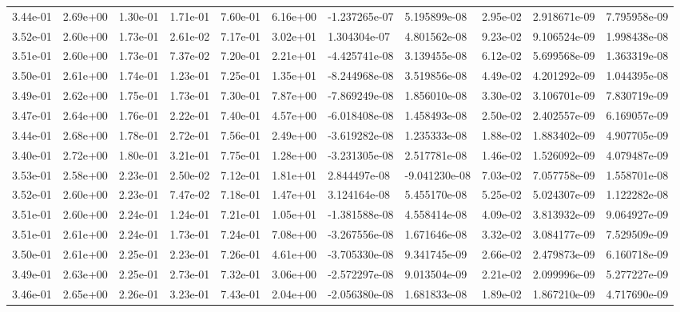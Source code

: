 \begin{longtable}{| p{} | p{} |}
3.44e-01 & 2.69e+00 & 1.30e-01 & 1.71e-01 & 7.60e-01 & 6.16e+00 & -1.237265e-07 &  5.195899e-08 &  2.95e-02 &  2.918671e-09 &  7.795958e-09 \\
3.52e-01 & 2.60e+00 & 1.73e-01 & 2.61e-02 & 7.17e-01 & 3.02e+01 &  1.304304e-07 &  4.801562e-08 &  9.23e-02 &  9.106524e-09 &  1.998438e-08 \\
3.51e-01 & 2.60e+00 & 1.73e-01 & 7.37e-02 & 7.20e-01 & 2.21e+01 & -4.425741e-08 &  3.139455e-08 &  6.12e-02 &  5.699568e-09 &  1.363319e-08 \\
3.50e-01 & 2.61e+00 & 1.74e-01 & 1.23e-01 & 7.25e-01 & 1.35e+01 & -8.244968e-08 &  3.519856e-08 &  4.49e-02 &  4.201292e-09 &  1.044395e-08 \\
3.49e-01 & 2.62e+00 & 1.75e-01 & 1.73e-01 & 7.30e-01 & 7.87e+00 & -7.869249e-08 &  1.856010e-08 &  3.30e-02 &  3.106701e-09 &  7.830719e-09 \\
3.47e-01 & 2.64e+00 & 1.76e-01 & 2.22e-01 & 7.40e-01 & 4.57e+00 & -6.018408e-08 &  1.458493e-08 &  2.50e-02 &  2.402557e-09 &  6.169057e-09 \\
3.44e-01 & 2.68e+00 & 1.78e-01 & 2.72e-01 & 7.56e-01 & 2.49e+00 & -3.619282e-08 &  1.235333e-08 &  1.88e-02 &  1.883402e-09 &  4.907705e-09 \\
3.40e-01 & 2.72e+00 & 1.80e-01 & 3.21e-01 & 7.75e-01 & 1.28e+00 & -3.231305e-08 &  2.517781e-08 &  1.46e-02 &  1.526092e-09 &  4.079487e-09 \\
3.53e-01 & 2.58e+00 & 2.23e-01 & 2.50e-02 & 7.12e-01 & 1.81e+01 &  2.844497e-08 & -9.041230e-08 &  7.03e-02 &  7.057758e-09 &  1.558701e-08 \\
3.52e-01 & 2.60e+00 & 2.23e-01 & 7.47e-02 & 7.18e-01 & 1.47e+01 &  3.124164e-08 &  5.455170e-08 &  5.25e-02 &  5.024307e-09 &  1.122282e-08 \\
3.51e-01 & 2.60e+00 & 2.24e-01 & 1.24e-01 & 7.21e-01 & 1.05e+01 & -1.381588e-08 &  4.558414e-08 &  4.09e-02 &  3.813932e-09 &  9.064927e-09 \\
3.51e-01 & 2.61e+00 & 2.24e-01 & 1.73e-01 & 7.24e-01 & 7.08e+00 & -3.267556e-08 &  1.671646e-08 &  3.32e-02 &  3.084177e-09 &  7.529509e-09 \\
3.50e-01 & 2.61e+00 & 2.25e-01 & 2.23e-01 & 7.26e-01 & 4.61e+00 & -3.705330e-08 &  9.341745e-09 &  2.66e-02 &  2.479873e-09 &  6.160718e-09 \\
3.49e-01 & 2.63e+00 & 2.25e-01 & 2.73e-01 & 7.32e-01 & 3.06e+00 & -2.572297e-08 &  9.013504e-09 &  2.21e-02 &  2.099996e-09 &  5.277227e-09 \\
3.46e-01 & 2.65e+00 & 2.26e-01 & 3.23e-01 & 7.43e-01 & 2.04e+00 & -2.056380e-08 &  1.681833e-08 &  1.89e-02 &  1.867210e-09 &  4.717690e-09 \\

\end{longtable}
